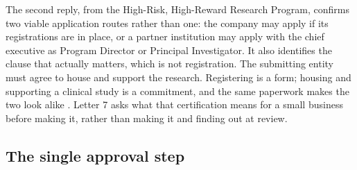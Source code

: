 The second reply, from the High-Risk, High-Reward Research Program, confirms two
viable application routes rather than one: the company may apply if its
registrations are in place, or a partner institution may apply with the chief
executive as Program Director or Principal Investigator. It also identifies the
clause that actually matters, which is not registration. The submitting entity
must agree to house and support the research. Registering is a form; housing and
supporting a clinical study is a commitment, and the same paperwork makes the two
look alike \cite{eracommons2026}. Letter 7 asks what that certification means for
a small business before making it, rather than making it and finding out at
review.

\subsection{The single approval step}

